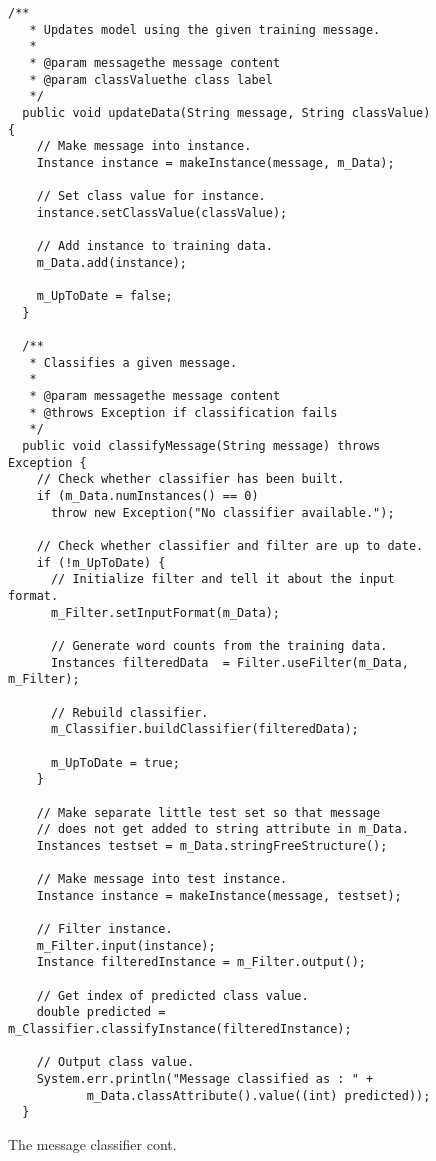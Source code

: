 \begin{figure}[!thp]
\ContinuedFloat
\begin{mdframed}[innermargin=-1cm]
\begin{Verbatim}[fontsize=\footnotesize]
  /**
   * Updates model using the given training message.
   *
   * @param messagethe message content
   * @param classValuethe class label
   */
  public void updateData(String message, String classValue) {
    // Make message into instance.
    Instance instance = makeInstance(message, m_Data);

    // Set class value for instance.
    instance.setClassValue(classValue);

    // Add instance to training data.
    m_Data.add(instance);

    m_UpToDate = false;
  }

  /**
   * Classifies a given message.
   *
   * @param messagethe message content
   * @throws Exception if classification fails
   */
  public void classifyMessage(String message) throws Exception {
    // Check whether classifier has been built.
    if (m_Data.numInstances() == 0)
      throw new Exception("No classifier available.");

    // Check whether classifier and filter are up to date.
    if (!m_UpToDate) {
      // Initialize filter and tell it about the input format.
      m_Filter.setInputFormat(m_Data);

      // Generate word counts from the training data.
      Instances filteredData  = Filter.useFilter(m_Data, m_Filter);

      // Rebuild classifier.
      m_Classifier.buildClassifier(filteredData);

      m_UpToDate = true;
    }

    // Make separate little test set so that message
    // does not get added to string attribute in m_Data.
    Instances testset = m_Data.stringFreeStructure();

    // Make message into test instance.
    Instance instance = makeInstance(message, testset);

    // Filter instance.
    m_Filter.input(instance);
    Instance filteredInstance = m_Filter.output();

    // Get index of predicted class value.
    double predicted = m_Classifier.classifyInstance(filteredInstance);

    // Output class value.
    System.err.println("Message classified as : " +
           m_Data.classAttribute().value((int) predicted));
  }
\end{Verbatim}
\end{mdframed}
\caption{\label{fig:message_classifier}The message classifier cont.}
\end{figure}

